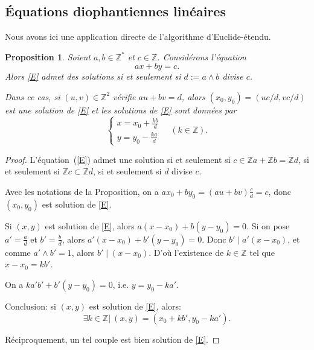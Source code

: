 \documentclass[12pt]{report}
\newtheorem{Prop}[thm]{Proposition}
\newcommand{\Z}{\mathbb{Z}}
\begin{document}



\subsection{Équations diophantiennes linéaires}

Nous avons ici une application directe de l'algorithme d'Euclide-étendu.

\begin{Prop}
Soient $a,b \in \mathbb{Z}^*$ et $c \in \mathbb{Z}$. Considérons l'équation
\begin{equation}\label{E}
ax+by=c.
\end{equation}
Alors \eqref{E} admet des solutions si et seulement si $d:=a\wedge b$ divise $c$.\par 
Dans ce cas, si $(u,v) \in \mathbb{Z}^2$ vérifie $au+bv=d$, alors $(x_0,y_0)=(uc/d,vc/d)$ est une solution de \eqref{E} et les solutions de \eqref{E} sont données par 
\begin{equation*}
  \begin{cases} \displaystyle
x=x_0+\frac{kb}{d} \\
\displaystyle y=y_0 - \frac{ka}{d} 
\end{cases}  \quad(k \in \mathbb{Z}).
\end{equation*}
\end{Prop}

\begin{proof}
L'équation~(\ref{E}) admet une solution si et seulement si $c\in \Z a+\Z b=\Z d$, si et seulement si $\Z c\subset \Z d$, si et seulement si $d$ divise $c$. \par 
Avec les notations de la Proposition, on a $ax_0+b y_0= (au+bv)\tfrac{c}{d}=c$, donc $(x_0,y_0)$ est solution de \eqref{E}.\par 
Si $(x,y)$ est solution de \eqref{E}, alors $a(x-x_0)+b(y-y_0)=0$. Si on pose $a'=\frac{a}{d}$ et $b'=\frac{b}{d}$, alors $a'(x-x_0)+b'(y-y_0)=0$. Donc $b' \mid a'(x-x_0)$, et comme $a'\wedge b'=1$, alors $b' \mid (x-x_0)$. D'où l'existence de $k \in \mathbb{Z}$ tel que  $x-x_0=kb'$.\par 
On a $ka'b'+b'(y-y_0)=0$, i.e. $y=y_0-ka'$. \par 
Conclusion: si $(x,y)$ est solution de \eqref{E}, alors: \[\exists k \in \mathbb{Z}|\ (x,y)=(x_0+kb',y_0-ka').\] 

 
Réciproquement, un tel couple est bien solution de \eqref{E}.
\end{proof}
\end{document}

